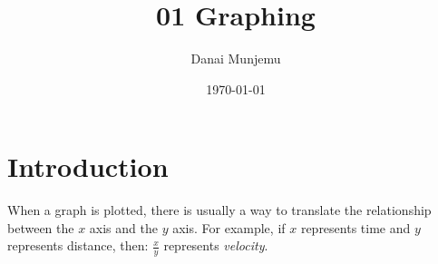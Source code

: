 \documentclass{article}
\title{01 Graphing}
\author{Danai Munjemu}
\date{\today}
\begin{document}
\maketitle %

\section{Introduction}
When a graph is plotted, there is usually a way to translate the relationship between the $x$ axis and the $y$ axis. For example, if $x$ represents time and $y$ represents distance, then:
$\frac{x}{y}$ represents \textit{velocity}.
\end{document}
